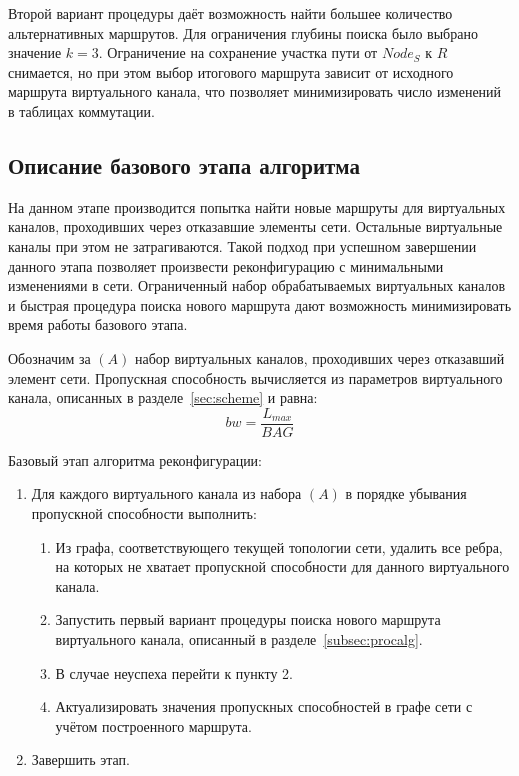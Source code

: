 \documentclass[12pt, a4paper]{article}
\begin{document}
Второй вариант процедуры даёт возможность найти большее количество альтернативных маршрутов. Для ограничения глубины поиска было выбрано значение $k = 3$. Ограничение на сохранение участка пути от $Node_{S}$ к $R$ снимается, но при этом выбор итогового маршрута зависит от исходного маршрута виртуального канала, что позволяет минимизировать число изменений в таблицах коммутации.

\subsection{Описание базового этапа алгоритма}

На данном этапе производится попытка найти новые маршруты для виртуальных каналов, проходивших через отказавшие элементы сети. Остальные виртуальные каналы при этом не затрагиваются. Такой подход при успешном завершении данного этапа позволяет произвести реконфигурацию с минимальными изменениями в сети. Ограниченный набор обрабатываемых виртуальных каналов и быстрая процедура поиска нового маршрута дают возможность минимизировать время работы базового этапа.

Обозначим за $(A)$ набор виртуальных каналов, проходивших через отказавший элемент сети. Пропускная способность вычисляется из параметров виртуального канала, описанных в разделе~\ref{sec:scheme} и равна:
$$bw = \frac{L_{max}}{BAG}$$

Базовый этап алгоритма реконфигурации:
\begin{enumerate}
	\item Для каждого виртуального канала из набора $(A)$ в порядке убывания пропускной способности выполнить:
	\begin{enumerate}
	\item Из графа, соответствующего текущей топологии сети, удалить все ребра, на которых не хватает пропускной способности для данного виртуального канала.
	\item Запустить первый вариант процедуры поиска нового маршрута виртуального канала, описанный в разделе~\ref{subsec:procalg}.
	\item В случае неуспеха перейти к пункту 2.
	\item Актуализировать значения пропускных способностей в графе сети с учётом построенного маршрута.
	\end{enumerate}
	\item Завершить этап.
\end{enumerate}
\end{document}
